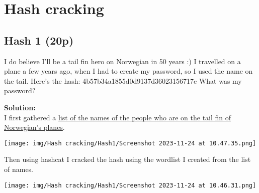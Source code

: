 \section{Hash cracking}

\subsection{Hash 1 (20p)}
\addtocounter{points}{20}
I do believe I'll be a tail fin hero on Norwegian in 50 years :) I travelled on a plane a few years ago, when I had to create my password, so I used the name on the tail. Here's the hash: 4b57b34a1855d0d9137d36023156717c What was my password?

\textbf{Solution:}\\
I first gathered a \href{https://en.wikipedia.org/wiki/List_of_Norwegian_Air_Shuttle_tail_fin_heroes_and_fleet}{list of the names of the people who are on the tail fin of Norwegian's planes}.

\begin{center}
    \texttt{[image: img/Hash cracking/Hash1/Screenshot 2023-11-24 at 10.47.35.png]}
\end{center}

Then using hashcat I cracked the hash using the wordlist I created from the list of names.

\begin{center}
    \texttt{[image: img/Hash cracking/Hash1/Screenshot 2023-11-24 at 10.46.31.png]}
\end{center}